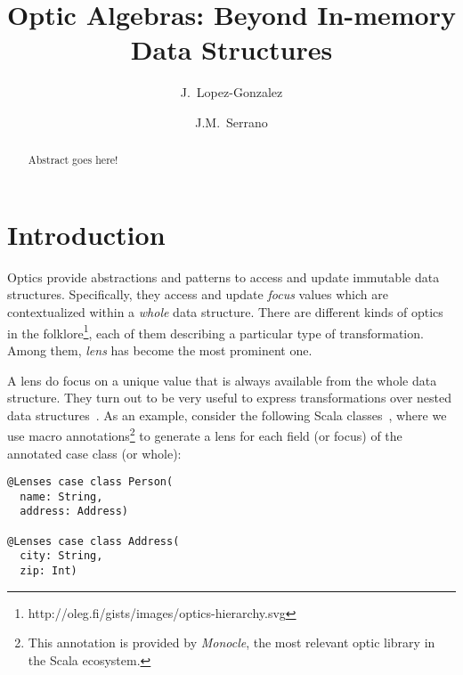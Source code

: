 \documentclass[preview, 3p]{elsarticle}
\begin{document}
\begin{frontmatter}

\title{Optic Algebras: Beyond In-memory Data Structures}

\author[urjc,habla]{J.~Lopez-Gonzalez}

\author[urjc,habla]{J.M.~Serrano}



\address[urjc]{Universidad Rey Juan Carlos}
\address[habla]{Habla Computing}

\begin{abstract}
Abstract goes here!
\end{abstract}

\end{frontmatter}


\newtheorem*{remark}{Remark}

\section{Introduction}
\label{sec:Introduction}

Optics provide abstractions and patterns to access and update immutable data
structures. Specifically, they access and update \emph{focus} values which are
contextualized within a \emph{whole} data structure. There are different kinds
of optics in the
folklore\footnote{http://oleg.fi/gists/images/optics-hierarchy.svg}, each of
them describing a particular type of transformation. Among them, \emph{lens} has
become the most prominent one.

A lens do focus on a unique value that is always available from the whole data
structure. They turn out to be very useful to express transformations over
nested data structures~\cite{foster2005combinators}. As an example, consider the
following Scala classes~\cite{odersky2004overview}, where we use macro
annotations\footnote{This annotation is provided by \emph{Monocle}, the most
relevant optic library in the Scala ecosystem.} to generate a lens for each
field (or focus) of the annotated case class (or whole):

\begin{lstlisting}
@Lenses case class Person(
  name: String,
  address: Address)

@Lenses case class Address(
  city: String,
  zip: Int)
\end{lstlisting}
\end{document}
